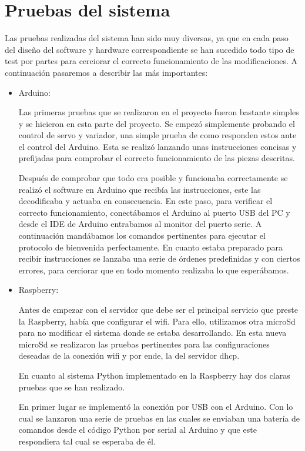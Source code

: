 \documentclass{pclass}
\begin{document}
\section{Pruebas del sistema} 

Las pruebas realizadas del sistema han sido muy diversas, ya que en cada paso del diseño del software y hardware correspondiente se han sucedido todo tipo de test por partes para cerciorar el correcto funcionamiento de las modificaciones. A continuación pasaremos a describir las más importantes:

\begin{itemize}
	\item Arduino:
	
		Las primeras pruebas que se realizaron en el proyecto fueron bastante simples y se hicieron en esta parte del proyecto. Se empezó simplemente probando el control de servo y variador, una simple prueba de como responden estos ante el control del Arduino. Esta se realizó lanzando unas instrucciones concisas y prefijadas para comprobar el correcto funcionamiento de las piezas descritas.
		
		Después de comprobar que todo era posible y funcionaba correctamente se realizó el software en Arduino que recibía las instrucciones, este las decodificaba y actuaba en consecuencia. En este paso, para verificar el correcto funcionamiento, conectábamos el Arduino al puerto USB del PC y desde el IDE de Arduino entrabamos al monitor del puerto serie. A continuación mandábamos los comandos pertinentes para ejecutar el protocolo de bienvenida perfectamente. En cuanto estaba preparado para recibir instrucciones se lanzaba una serie de órdenes predefinidas y con ciertos errores, para cerciorar que en todo momento realizaba lo que esperábamos. 
		
	\item Raspberry:
	
		Antes de empezar con el servidor que debe ser el principal servicio que preste la Raspberry, había que configurar el wifi. Para ello, utilizamos otra microSd para no modificar el sistema donde se estaba desarrollando. En esta nueva microSd se realizaron las pruebas pertinentes para las configuraciones deseadas de la conexión wifi y por ende, la del servidor dhcp.
	
		En cuanto al sistema Python implementado en la Raspberry hay dos claras pruebas que se han realizado.
		
		En primer lugar se implementó la conexión por USB con el Arduino. Con lo cual se lanzaron una serie de pruebas en las cuales se enviaban una batería de comandos desde el código Python por serial al Arduino y que este respondiera tal cual se esperaba de él.
		

\end{itemize}
\end{document}
